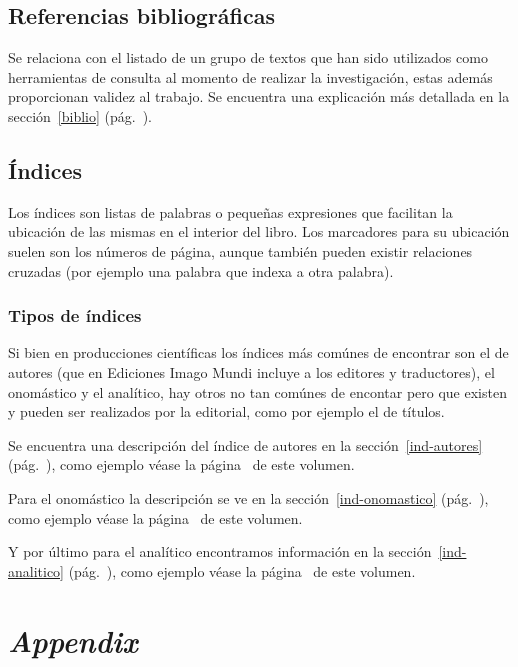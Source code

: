 \documentclass{book}
\begin{document}
{{{{{{{{{{{{{{{{{\subsection{Referencias bibliográficas}

Se relaciona con el listado de un grupo de textos que han sido utilizados como herramientas de consulta al momento de realizar la investigación, estas además proporcionan validez al trabajo. Se encuentra una explicación más detallada en la sección~\ref{biblio} (pág.~\pageref{biblio}).

\subsection{Índices}

Los índices son listas de palabras o pequeñas expresiones que facilitan la ubicación de las mismas en el interior del libro. Los marcadores para su ubicación suelen son los números de página, aunque también pueden existir relaciones cruzadas (por ejemplo una palabra que indexa a otra palabra).

\subsubsection{Tipos de índices}

Si bien en producciones científicas los índices más comúnes de encontrar son el de autores (que en Ediciones Imago Mundi incluye a los editores y traductores), el onomástico y el analítico, hay otros no tan comúnes de encontar pero que existen y pueden ser realizados por la editorial, como por ejemplo el de títulos.

Se encuentra una descripción del índice de autores en la sección~\ref{ind-autores} (pág.~\pageref{ind-autores}), como ejemplo véase la página~\pageref{comienzo-autores} de este volumen.

Para el onomástico la descripción se ve en la sección~\ref{ind-onomastico} (pág.~\pageref{ind-onomastico}), como ejemplo véase la página~\pageref{comienzo-apellidos} de este volumen.

Y por último para el analítico encontramos información en la sección~\ref{ind-analitico} (pág.~\pageref{ind-analitico}), como ejemplo véase la página~\pageref{comienzo-claves} de este volumen.


\section{\emph{Appendix}}

}}}}}}}}}}}}}}}}}
\end{document}
